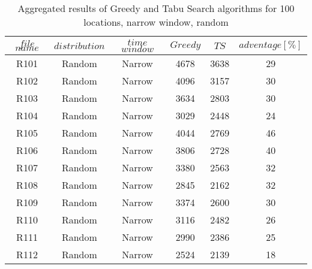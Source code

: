 \begin{table}[t]
\centering
\caption{
Aggregated results of Greedy and Tabu Search algorithms for 100 locations, narrow window, random}
\begin{tabular*}{0.8\linewidth}{@{\extracolsep{\fill}}cccccc}
\toprule
$file$ $name$ & $distribution$ & $time$ $window$ & $Greedy$ & $TS$ & $adventage[\%]$ \\ \midrule
R101 & Random & Narrow & 4678 & 3638 & 29\\
R102 & Random & Narrow & 4096 & 3157 & 30\\
R103 & Random & Narrow & 3634 & 2803 & 30\\
R104 & Random & Narrow & 3029 & 2448 & 24\\
R105 & Random & Narrow & 4044 & 2769 & 46\\
R106 & Random & Narrow & 3806 & 2728 & 40\\
R107 & Random & Narrow & 3380 & 2563 & 32\\
R108 & Random & Narrow & 2845 & 2162 & 32\\
R109 & Random & Narrow & 3374 & 2600 & 30\\
R110 & Random & Narrow & 3116 & 2482 & 26\\
R111 & Random & Narrow & 2990 & 2386 & 25\\
R112 & Random & Narrow & 2524 & 2139 & 18\\
\end{tabular*}\end{table}